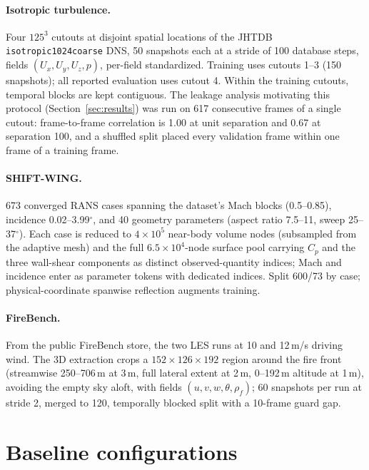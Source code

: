 \documentclass{article} %
\begin{document}
\paragraph{Isotropic turbulence.} Four $125^3$ cutouts at disjoint spatial locations of the JHTDB \texttt{isotropic1024coarse} DNS, 50 snapshots each at a stride of 100 database steps, fields $(U_x,U_y,U_z,p)$, per-field standardized. Training uses cutouts 1--3 (150 snapshots); all reported evaluation uses cutout 4. Within the training cutouts, temporal blocks are kept contiguous. The leakage analysis motivating this protocol (Section~\ref{sec:results}) was run on 617 consecutive frames of a single cutout: frame-to-frame correlation is 1.00 at unit separation and 0.67 at separation 100, and a shuffled split placed every validation frame within one frame of a training frame.

\paragraph{SHIFT-WING.} 673 converged RANS cases spanning the dataset's Mach blocks (0.5--0.85), incidence 0.02--3.99$^\circ$, and 40 geometry parameters (aspect ratio 7.5--11, sweep 25--37$^\circ$). Each case is reduced to $4\times10^5$ near-body volume nodes (subsampled from the adaptive mesh) and the full $6.5\times10^4$-node surface pool carrying $C_p$ and the three wall-shear components as distinct observed-quantity indices; Mach and incidence enter as parameter tokens with dedicated indices. Split 600/73 by case; physical-coordinate spanwise reflection augments training.

\paragraph{FireBench.} From the public FireBench store, the two LES runs at 10 and 12\,m/s driving wind. The 3D extraction crops a $152\times126\times192$ region around the fire front (streamwise 250--706\,m at 3\,m, full lateral extent at 2\,m, 0--192\,m altitude at 1\,m), avoiding the empty sky aloft, with fields $(u,v,w,\theta,\rho_f)$; 60 snapshots per run at stride 2, merged to 120, temporally blocked split with a 10-frame guard gap.

\section{Baseline configurations}
\label{app:baselines}
\end{document}

